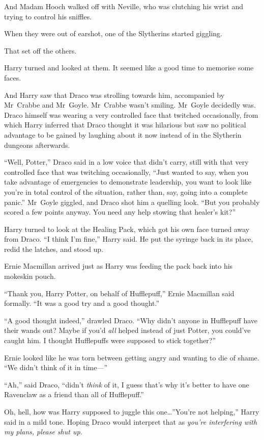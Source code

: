 And Madam Hooch walked off with Neville, who was clutching his wrist and trying to control his sniffles.

When they were out of earshot, one of the Slytherins started giggling.

That set off the others.

Harry turned and looked at them. It seemed like a good time to memorise some faces.

And Harry saw that Draco was strolling towards him, accompanied by Mr~Crabbe and Mr~Goyle. Mr~Crabbe wasn’t smiling. Mr~Goyle decidedly was. Draco himself was wearing a very controlled face that twitched occasionally, from which Harry inferred that Draco thought it was hilarious but saw no political advantage to be gained by laughing about it now instead of in the Slytherin dungeons afterwards.

“Well, Potter,” Draco said in a low voice that didn’t carry, still with that very controlled face that was twitching occasionally, “Just wanted to say, when you take advantage of emergencies to demonstrate leadership, you want to look like you’re in total control of the situation, rather than, say, going into a complete panic.” Mr~Goyle giggled, and Draco shot him a quelling look. “But you probably scored a few points anyway. You need any help stowing that healer’s kit?”

Harry turned to look at the Healing Pack, which got his own face turned away from Draco. “I think I’m fine,” Harry said. He put the syringe back in its place, redid the latches, and stood up.

Ernie Macmillan arrived just as Harry was feeding the pack back into his mokeskin pouch.

“Thank you, Harry Potter, on behalf of Hufflepuff,” Ernie Macmillan said formally. “It was a good try and a good thought.”

“A good thought indeed,” drawled Draco. “Why didn’t anyone in Hufflepuff have their wands out? Maybe if you’d \emph{all} helped instead of just Potter, you could’ve caught him. I thought Hufflepuffs were supposed to stick together?”

Ernie looked like he was torn between getting angry and wanting to die of shame. “We didn’t think of it in time—”

“Ah,” said Draco, “didn’t \emph{think} of it, I guess that’s why it’s better to have one Ravenclaw as a friend than all of Hufflepuff.”

Oh, hell, how was Harry supposed to juggle this one…”You’re not helping,” Harry said in a mild tone. Hoping Draco would interpret that as \emph{you’re interfering with my plans, please shut up.}

